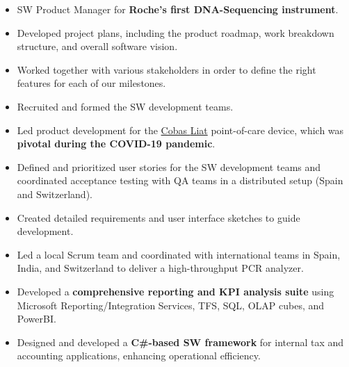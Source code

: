 \documentclass[10pt,a4paper]{altacv}
\begin{document}
\begin{itemize}
	\item SW Product Manager for \textbf{Roche's first DNA-Sequencing instrument}.
	\item Developed project plans, including the product roadmap, work breakdown structure, and overall software vision. 
	\item Worked together with various stakeholders in order to define the right features for each of our milestones.
	\item Recruited and formed the SW development teams.
\end{itemize}


\begin{itemize}
	\item Led product development for the {\href{https://www.cobasliat.com/}{\textsuperscript{\textregistered}Cobas \textsuperscript{\textregistered}Liat}} point-of-care device, which was \textbf{pivotal during the COVID-19 pandemic}.
	\item Defined and prioritized user stories for the SW development teams and coordinated acceptance testing with QA teams in a distributed setup (Spain and Switzerland).
	\item Created detailed requirements and user interface sketches to guide development.
\end{itemize}

\begin{itemize}
	\item Led a local Scrum team and coordinated with international teams in Spain, India, and Switzerland to deliver a high-throughput PCR analyzer.
	\item Developed a \textbf{comprehensive reporting and KPI analysis suite} using Microsoft Reporting/Integration Services, TFS, SQL, OLAP cubes, and PowerBI.
\end{itemize}

\divider

\begin{itemize}
	\item Designed and developed a \textbf{C{\#}-based SW framework} for internal tax and accounting applications, enhancing operational efficiency.
\end{itemize}
\end{document}
